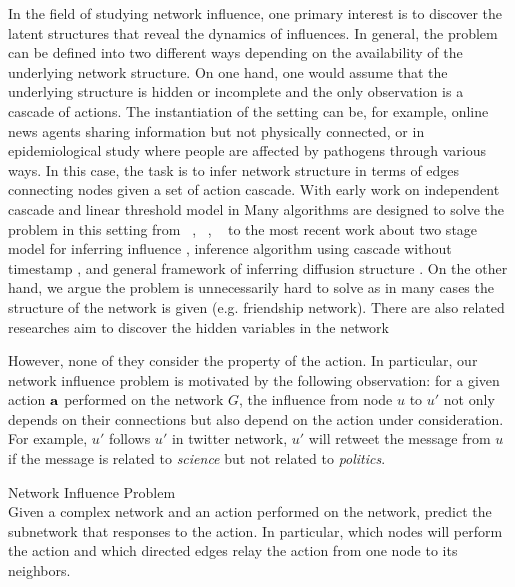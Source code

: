{In the field of studying network influence, one primary interest is to discover the latent structures that reveal the dynamics of influences.
In general, the problem can be defined into two different ways depending on the availability of the underlying network structure.
On one hand, one would assume that the underlying structure is hidden or incomplete and the only observation is a cascade of actions.
The instantiation of the setting can be, for example, online news agents sharing information but not physically connected, or in epidemiological study where people are affected by pathogens through various ways.
In this case, the task is to infer network structure in terms of edges connecting nodes given a set of action cascade.
With early work on independent cascade and linear threshold model in 
Many algorithms are designed to solve the problem in this setting from \netinf\ \citep{GomezRodriguez10inferring}, \netrate\ \citep{Rodrigues11unconvering}, \ \citep{Du12learning} to the most recent work about two stage model for inferring influence \citep{Du14influence}, inference algorithm using cascade without timestamp \citep{Amin14learning}, and general framework of inferring diffusion structure \citep{Daneshmand14estimating}.
On the other hand, we argue the problem is unnecessarily hard to solve as in many cases the structure of the network is given (e.g. friendship network).
There are also related researches aim to discover the hidden variables in the network \citep{Lovrek08prediction,Goyal10learning}

However, none of they consider the property of the action.
In particular, our network influence problem is motivated by the following observation: for a given action $\mathbf {a}$ performed on the network $G$, the influence from node $u$ to $u'$ not only depends on their connections but also depend on the action under consideration.
For example, $u'$ follows $u'$ in twitter network, $u'$ will retweet the message from $u$ if the message is related to \textit{science} but not related to \textit{politics}.

\begin{definition}{Network Influence Problem}\\
	Given a complex network and an action performed on the network, predict the subnetwork that responses to the action. In particular, which nodes will perform the action and which directed edges relay the action from one node to its neighbors.
\end{definition}


%
%
}
